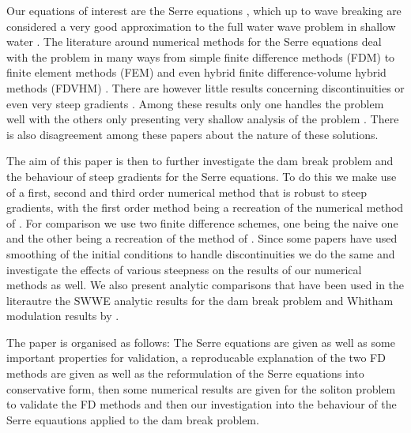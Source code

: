 \documentclass[SingleSpace,12pt,Proceedings]{Serre_ASCE}
\begin{document}
Our equations of interest are the Serre equations \cite{Serre-F-1953-857,Su-Gardener-1969-536,Seabra-Santos-etal-1987-117,Green-Naghdi-1976-237}, which up to wave breaking are considered a very good approximation to the full water wave problem in shallow water \cite{Bonneton-etal-2011-1479}. The literature around numerical methods for the Serre equations deal with the problem in many ways from simple finite difference methods (FDM) \cite{Antunes-do-Carmo-etal-1993-725,Nwogu-O-1993-618,El-etal-2006} to finite element methods (FEM) \cite{Guyenne-etal-2014-169,Dutykh-2014-315} and even hybrid finite difference-volume hybrid methods (FDVHM) \cite{Hank-etal-2010-2034,Zoppou-etal-2017,Filippini-etal-2016-381,Bradford-Sanders-2002-953}. There are however little results concerning discontinuities or even very steep gradients \cite{El-etal-2006,Hank-etal-2010-2034,Dutykh-2014-315}. Among these results only one handles the problem well \cite{El-etal-2006} with the others only presenting very shallow analysis of the problem \cite{Hank-etal-2010-2034,Dutykh-2014-315}. There is also disagreement among these papers about the nature of these solutions. 

The aim of this paper is then to further investigate the dam break problem and the behaviour of steep gradients for the Serre equations. To do this we make use of a first, second and third order numerical method that is robust to steep gradients, with the first order method being a recreation of the numerical method of . For comparison we use two finite difference schemes, one being the naive one and the other being a recreation of the method of . Since some papers \cite{Dutykh-2014-315,El-etal-2006} have used smoothing of the initial conditions to handle discontinuities we do the same and investigate the effects of various steepness on the results of our numerical methods as well. We also present analytic comparisons that have been used in the literautre the SWWE analytic results for the dam break problem \cite{Wu-etal-1999-1210} and Whitham modulation results by .

The paper is organised as follows: The Serre equations are given as well as some important properties for validation, a reproducable explanation of the two FD methods are given as well as the reformulation of the Serre equations into conservative form, then some numerical results are given for the soliton problem to validate the FD methods and then our investigation into the behaviour of the Serre equautions applied to the dam break problem. 
\end{document}
